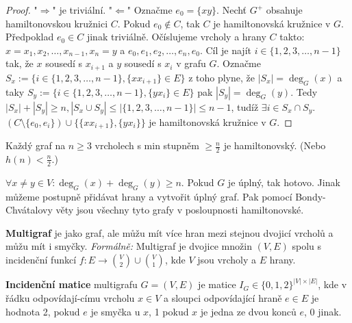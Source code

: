 \begin{proof}
	"$\Rightarrow$" je triviální. "$\Leftarrow$" Označme $e_{0} = \{xy\}$. Nechť $G^{+}$ obsahuje hamiltonovskou kružnici $C$. Pokud $e_{0} \notin C$, tak $C$ je hamiltonovská kružnice v $G$. Předpoklad $e_{0} \in C$ jinak triviálně. Očíslujeme vrcholy a hrany $C$ takto: $x = x_{1}, x_{2}, \dots, x_{n-1}, x_{n} = y$ a $e_{0}, e_{1}, e_{2}, \dots , e_{n}, e_{0}$. Cíl je najít $i \in \{1,2,3, \dots, n-1\}$ tak, že $x$ sousedí s $x_{i+1}$ a $y$ sousedí s $x_{i}$ v grafu $G$. Označme $S_{x} := \{i \in \{1,2,3,\dots,n-1\}, \{xx_{i+1}\} \in E\}$ z toho plyne, že $|S_{x}| = \deg_{G}(x)$ a taky $S_{y} := \{i \in \{1,2,3,\dots,n-1\}, \{yx_{i}\} \in E\}$ pak $|S_{y}| = \deg_{G}(y)$. Tedy $|S_{x}| + |S_{y}| \geq n, |S_{x} \cup S_{y}| \leq |\{1,2,3, \dots, n-1\}| \leq n-1$, tudíž $\exists i \in S_{x} \cap S_{y}$. $(C \setminus \{e_{0},e_{i}\}) \cup \{\{xx_{i+1}\},\{yx_{i}\}\}$ je hamiltonovská kružnice v $G$.
\end{proof}

\begin{dusl}[Dirac]
	Každý graf na $n \geq 3$ vrcholech s min stupněm $\geq \frac{n}{2}$ je hamiltonovský. (Nebo $h(n) < \frac{n}{2}$.)
\end{dusl}

\begin{dusl}
	$\forall x \neq y \in V: \deg_{G}(x) + \deg_{G}(y) \geq n$. Pokud $G$ je úplný, tak hotovo. Jinak můžeme postupně přidávat hrany a vytvořit úplný graf. Pak pomocí Bondy-Chvátalovy věty jsou všechny tyto grafy v posloupnosti hamiltonovské.
\end{dusl}

\begin{definice}
	\textbf{Multigraf} je jako graf, ale můžu mít více hran mezi stejnou dvojicí vrcholů a můžu mít i smyčky. \textit{Formálně:} Multigraf je dvojice množin $(V,E)$ spolu s incidenční funkcí $f: E \to \binom{V}{2} \cup \binom{V}{1}$, kde $V$ jsou vrcholy a $E$ hrany.
\end{definice}

\begin{definice}
	\textbf{Incidenční matice} multigrafu $G = (V,E)$ je matice $I_{G} \in \{0,1,2\}^{|V| \times |E|}$, kde v řádku odpovídají-\newline címu vrcholu $x \in V$ a sloupci odpovídající hraně $e \in E$ je hodnota 2, pokud $e$ je smyčka u $x$, 1 pokud $x$ je jedna ze dvou konců $e$, 0 jinak.
\end{definice}

